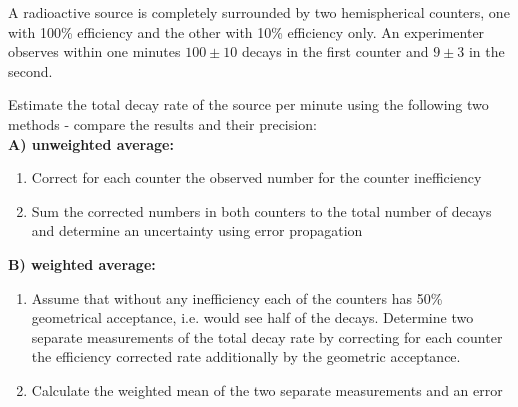 \begin{slide}
\pagestyle{headings}
\sf
{}
A radioactive source is completely surrounded by two
hemispherical counters, one with 100\% efficiency and the other
with 10\% efficiency only. 
%
An experimenter observes within one minutes $100\pm 10$ decays
in the first counter and $9\pm 3$ in the second.
%

\noindent
Estimate the total decay rate of the source per minute
using the following two methods - compare the results and
their precision:\\[2mm]
{\bfseries  A) unweighted average:}
\begin{enumerate}
\item 
Correct for each counter the observed number for the counter inefficiency
\item
Sum the corrected numbers in both counters to the total
number of decays and determine an uncertainty using error propagation
\end{enumerate}
\vspace{2mm}
{\bfseries  B)  weighted average:}
\begin{enumerate}
\item
Assume that without any inefficiency each of the counters
has 50\% geometrical acceptance, i.e. would see half of the
decays. Determine two separate measurements of the total
decay rate by correcting for each counter the efficiency corrected
rate additionally by the geometric acceptance.
\item
Calculate the weighted mean of the two separate measurements
and an error
\end{enumerate}
%
\end{slide}

